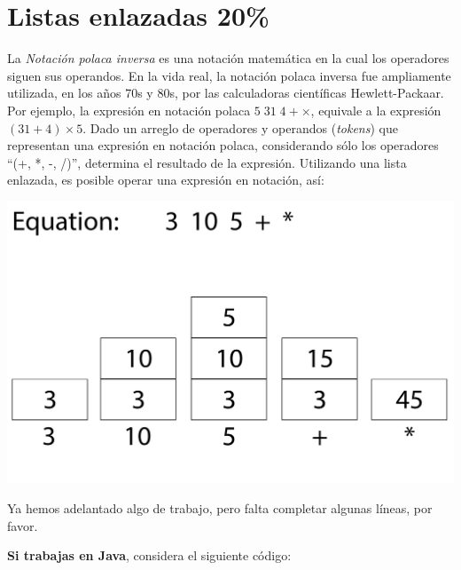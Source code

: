 \documentclass[10 pt]{article}
\begin{document}
\newpage

\section{Listas enlazadas 20\%}

La \textit{Notación polaca inversa} es una notación matemática en la cual los operadores siguen sus operandos. En la vida real, la notación polaca inversa fue ampliamente utilizada, en los años 70s y 80s, por las calculadoras científicas 
Hewlett-Packaar. Por ejemplo, la expresión en notación polaca $5\;31\;4 + \times$, equivale a la expresión $(31 + 4) \times 5$. Dado  un arreglo de operadores y operandos (\textit{tokens}) que representan una expresión en notación polaca, considerando sólo  los operadores ``(+, *, -, /)'', determina el resultado de la expresión. Utilizando una lista enlazada, es posible operar una expresión en notación, así:

\includegraphics[scale=0.07]{ReversePolishNotationStackExample.jpg}


Ya hemos adelantado algo de trabajo, pero falta completar algunas líneas, por favor.

\hspace{1 cm}

\textbf{Si trabajas en Java}, considera el siguiente código:
\end{document}

